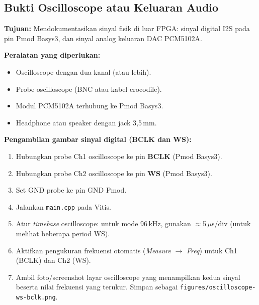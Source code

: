\subsection{Bukti Oscilloscope atau Keluaran Audio}
\label{app:panduan-scope}

\textbf{Tujuan:} Mendokumentasikan sinyal fisik di luar FPGA: sinyal digital I2S pada
pin Pmod Basys3, dan sinyal analog keluaran DAC PCM5102A.

\textbf{Peralatan yang diperlukan:}
\begin{itemize}
\item Oscilloscope dengan dua kanal (atau lebih).
\item Probe oscilloscope (BNC atau kabel crocodile).
\item Modul PCM5102A terhubung ke Pmod Basys3.
\item Headphone atau speaker dengan jack 3,5\,mm.
\end{itemize}

\textbf{Pengambilan gambar sinyal digital (BCLK dan WS):}
\begin{enumerate}
\item Hubungkan probe Ch1 oscilloscope ke pin \textbf{BCLK} (Pmod Basys3).
\item Hubungkan probe Ch2 oscilloscope ke pin \textbf{WS} (Pmod Basys3).
\item Set GND probe ke pin GND Pmod.
\item Jalankan \texttt{main.cpp} pada Vitis.
\item Atur \textit{timebase} oscilloscope: untuk mode 96\,kHz, gunakan
      $\approx$5\,$\mu$s/div (untuk melihat beberapa period WS).
\item Aktifkan pengukuran frekuensi otomatis (\textit{Measure} $\to$ \textit{Freq})
      untuk Ch1 (BCLK) dan Ch2 (WS).
\item Ambil foto/screenshot layar oscilloscope yang menampilkan kedua sinyal beserta
      nilai frekuensi yang terukur. Simpan sebagai \texttt{figures/oscilloscope-ws-bclk.png}.
\end{enumerate}

